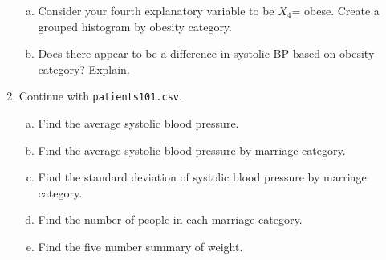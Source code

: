 \documentclass[twocolumn, 10pt, oneside]{article}
\begin{document}
\begin{enumerate}
\begin{enumerate}[(a)]
	\item Consider your fourth explanatory variable to be $X_4$= obese.  Create a grouped histogram by obesity category.
	\item Does there appear to be a difference in systolic BP based on obesity category?  Explain.
\end{enumerate}
\item  Continue with \texttt{patients101.csv}. 
\begin{enumerate}[(a)]
	\item Find the average systolic blood pressure.
	\item Find the average systolic blood pressure by marriage category.
	\item Find the standard deviation of systolic blood pressure by marriage category.
	\item Find the number of people in each marriage category.
	\item Find the five number summary of weight.
\end{enumerate}
\end{enumerate}
\end{document}
